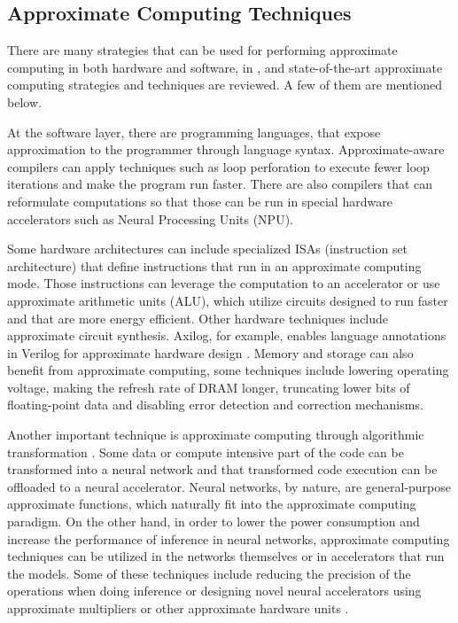 \subsection{Approximate Computing Techniques}

There are many strategies that can be used for performing approximate computing in both hardware and software, in \cite{Xu2016}, \cite{Mittal2016} and \cite{Han2013} state-of-the-art approximate computing strategies and techniques are reviewed. A few of them are mentioned below.

At the software layer, there are programming languages, that expose approximation to the programmer through language syntax. Approximate-aware compilers can apply techniques such as loop perforation to execute fewer loop iterations and make the program run faster. There are also compilers that can reformulate computations so that those can be run in special hardware accelerators such as Neural Processing Units (NPU).

Some hardware architectures can include specialized ISAs (instruction set architecture) that define instructions that run in an approximate computing mode. Those instructions can leverage the computation to an accelerator or use approximate arithmetic units (ALU), which utilize circuits designed to run faster and that are more energy efficient. Other hardware techniques include approximate circuit synthesis. Axilog, for example, enables language annotations in Verilog for approximate hardware design \cite{Yazdanbakhsh2015}. Memory and storage can also benefit from approximate computing, some techniques include lowering operating voltage, making the refresh rate of DRAM longer, truncating lower bits of floating-point data and disabling error detection and correction mechanisms.

Another important technique is approximate computing through algorithmic transformation \cite{Esmaeilzadeh2012}. Some data or compute intensive part of the code can be transformed into a neural network and that transformed code execution can be offloaded to a neural accelerator. Neural networks, by nature, are general-purpose approximate functions, which naturally fit into the approximate computing paradigm. On the other hand, in order to lower the power consumption and increase the performance of inference in neural networks, approximate computing techniques can be utilized in the networks themselves or in accelerators that run the models. Some of these techniques include reducing the precision of the operations when doing inference \cite{Hanif2018} or designing novel neural accelerators using approximate multipliers or other approximate hardware units \cite{Cheng2019}.

